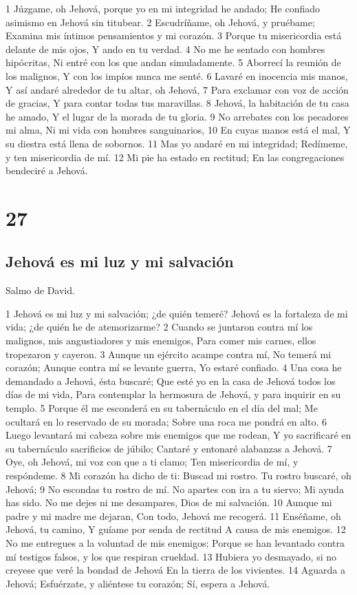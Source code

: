 1 Júzgame, oh Jehová, porque yo en mi integridad he andado;
He confiado asimismo en Jehová sin titubear.
2 Escudríñame, oh Jehová, y pruébame;
Examina mis íntimos pensamientos y mi corazón.
3 Porque tu misericordia está delante de mis ojos,
Y ando en tu verdad.
4 No me he sentado con hombres hipócritas,
Ni entré con los que andan simuladamente.
5 Aborrecí la reunión de los malignos,
Y con los impíos nunca me senté.
6 Lavaré en inocencia mis manos,
Y así andaré alrededor de tu altar, oh Jehová,
7 Para exclamar con voz de acción de gracias,
Y para contar todas tus maravillas.
8 Jehová, la habitación de tu casa he amado,
Y el lugar de la morada de tu gloria.
9 No arrebates con los pecadores mi alma,
Ni mi vida con hombres sanguinarios,
10 En cuyas manos está el mal,
Y su diestra está llena de sobornos.
11 Mas yo andaré en mi integridad;
Redímeme, y ten misericordia de mí.
12 Mi pie ha estado en rectitud;
En las congregaciones bendeciré a Jehová.

\chapter{27}

\section*{Jehová es mi luz y mi salvación}

Salmo de David.

1 Jehová es mi luz y mi salvación; ¿de quién temeré?
Jehová es la fortaleza de mi vida; ¿de quién he de atemorizarme?
2 Cuando se juntaron contra mí los malignos, mis angustiadores y mis enemigos,
Para comer mis carnes, ellos tropezaron y cayeron.
3 Aunque un ejército acampe contra mí,
No temerá mi corazón;
Aunque contra mí se levante guerra,
Yo estaré confiado.
4 Una cosa he demandado a Jehová, ésta buscaré;
Que esté yo en la casa de Jehová todos los días de mi vida,
Para contemplar la hermosura de Jehová, y para inquirir en su templo.
5 Porque él me esconderá en su tabernáculo en el día del mal;
Me ocultará en lo reservado de su morada;
Sobre una roca me pondrá en alto.
6 Luego levantará mi cabeza sobre mis enemigos que me rodean,
Y yo sacrificaré en su tabernáculo sacrificios de júbilo;
Cantaré y entonaré alabanzas a Jehová.
7 Oye, oh Jehová, mi voz con que a ti clamo;
Ten misericordia de mí, y respóndeme.
8 Mi corazón ha dicho de ti: Buscad mi rostro.
Tu rostro buscaré, oh Jehová;
9 No escondas tu rostro de mí.
No apartes con ira a tu siervo;
Mi ayuda has sido.
No me dejes ni me desampares, Dios de mi salvación.
10 Aunque mi padre y mi madre me dejaran,
Con todo, Jehová me recogerá.
11 Enséñame, oh Jehová, tu camino,
Y guíame por senda de rectitud
A causa de mis enemigos.
12 No me entregues a la voluntad de mis enemigos;
Porque se han levantado contra mí testigos falsos, y los que respiran crueldad.
13 Hubiera yo desmayado, si no creyese que veré la bondad de Jehová
En la tierra de los vivientes.
14 Aguarda a Jehová;
Esfuérzate, y aliéntese tu corazón;
Sí, espera a Jehová.

